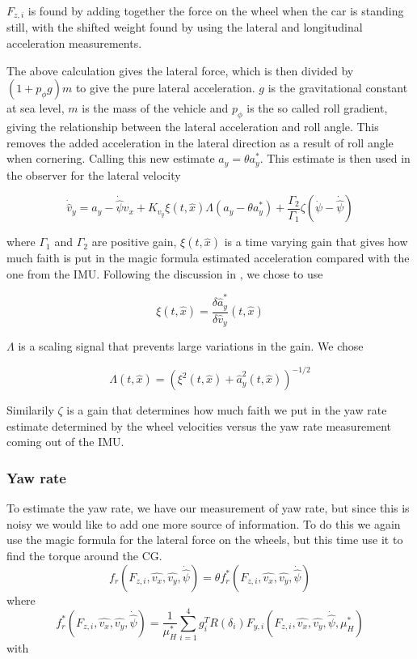 $F_{z,i}$ is found by adding together the force on the wheel when the car is standing still, with the shifted weight found by using the lateral and longitudinal acceleration measurements.  

The above calculation gives the lateral force, which is then divided by $(1 + p_{\phi}g)m$ to give the pure lateral acceleration. $g$ is the gravitational constant at sea level, $m$ is the mass of the vehicle and $p_{\phi}$ is the so called roll gradient, giving the relationship between the lateral acceleration and roll angle. This removes the added acceleration in the lateral direction as a result of roll angle when cornering. Calling this new estimate $a_y = \theta a_y^*$. This estimate is then used in the observer for the lateral velocity

\begin{equation}
    \dot{\hat{v}}_y = a_y - \dot{\hat{\psi}}\hat{v}_x + K_{v_y}\xi(t,\hat{x})\Lambda(a_y - \theta a_y^{*}) + \frac{\Gamma_2}{\Gamma_1}\zeta(\dot{\psi} - \dot{\hat{\psi}})
\end{equation}

where $\Gamma_1$ and $\Gamma_2$ are positive gain, $\xi(t,\hat{x})$ is a time varying gain that gives how much faith is put in the magic formula estimated acceleration compared with the one from the IMU. Following the discussion in \cite{MainStateEst}, we chose to use

\begin{equation}
    \xi(t,\hat{x}) = \frac{\delta \hat{a}_y^*}{\delta \hat{v}_y}(t,\hat{x})
\end{equation}

$\Lambda$ is a scaling signal that prevents large variations in the gain. We chose

\begin{equation}
    \Lambda(t,\hat{x}) = (\xi^2(t,\hat{x}) + \hat{a}_y^2(t,\hat{x}))^{-1/2}
\end{equation}

Similarily $\zeta$ is a gain that determines how much faith we put in the yaw rate estimate determined by the wheel velocities versus the yaw rate measurement coming out of the IMU.

\subsubsection{Yaw rate}

To estimate the yaw rate, we have our measurement of yaw rate, but since this is noisy we would like to add one more source of information. To do this we again use the magic formula for the lateral force on the wheels, but this time use it to find the torque around the CG.
\begin{equation}
    f_r(F_{z,i}, \hat{v_x}, \hat{v_y}, \dot{\hat{\psi}}) =\theta f_r^*(F_{z,i}, \hat{v_x}, \hat{v_y}, \dot{\hat{\psi}}) 
\end{equation}
where
\begin{equation}
    f_r^*(F_{z,i}, \hat{v_x}, \hat{v_y}, \dot{\hat{\psi}}) = \frac{1}{\mu_H^*}\sum_{i=1}^{4}g_i^TR(\delta_i)F_{y,i}(F_{z,i}, \hat{v_x}, \hat{v_y}, \dot{\hat{\psi}}, \mu_H^*)
\end{equation}
with 

